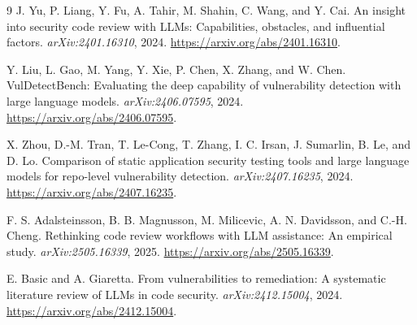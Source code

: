 \documentclass[10pt]{article}
\begin{document}
\begin{thebibliography}{9}
J. Yu, P. Liang, Y. Fu, A. Tahir, M. Shahin, C. Wang, and Y. Cai.
An insight into security code review with LLMs: Capabilities, obstacles, and
influential factors. \emph{arXiv:2401.16310}, 2024.
\url{https://arxiv.org/abs/2401.16310}.

Y. Liu, L. Gao, M. Yang, Y. Xie, P. Chen, X. Zhang, and W. Chen.
VulDetectBench: Evaluating the deep capability of vulnerability detection with
large language models. \emph{arXiv:2406.07595}, 2024.
\url{https://arxiv.org/abs/2406.07595}.

X. Zhou, D.-M. Tran, T. Le-Cong, T. Zhang, I. C. Irsan, J. Sumarlin, B. Le,
and D. Lo. Comparison of static application security testing tools and large
language models for repo-level vulnerability detection.
\emph{arXiv:2407.16235}, 2024.
\url{https://arxiv.org/abs/2407.16235}.

F. S. Adalsteinsson, B. B. Magnusson, M. Milicevic, A. N. Davidsson, and
C.-H. Cheng. Rethinking code review workflows with LLM assistance: An empirical
study. \emph{arXiv:2505.16339}, 2025.
\url{https://arxiv.org/abs/2505.16339}.

E. Basic and A. Giaretta. From vulnerabilities to remediation: A systematic
literature review of LLMs in code security. \emph{arXiv:2412.15004}, 2024.
\url{https://arxiv.org/abs/2412.15004}.
\end{thebibliography}
\end{document}
